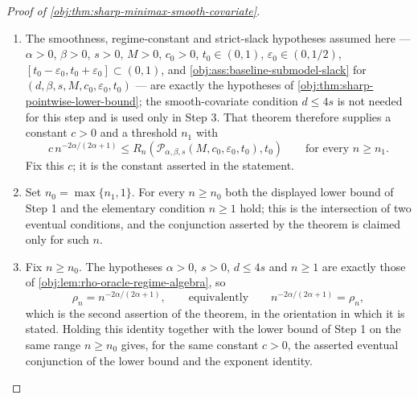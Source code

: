\documentclass[11pt]{article}
\begin{document}
\begin{proof}[Proof of \cref{obj:thm:sharp-minimax-smooth-covariate}]
\begin{enumerate}
\item The smoothness, regime-constant and strict-slack hypotheses assumed here — \(\alpha>0\),
\(\beta>0\), \(s>0\), \(M>0\), \(c_0>0\), \(t_0\in(0,1)\), \(\varepsilon_0\in(0,1/2)\),
\([t_0-\varepsilon_0,t_0+\varepsilon_0]\subset(0,1)\), and \cref{obj:ass:baseline-submodel-slack}
for \((d,\beta,s,M,c_0,\varepsilon_0,t_0)\) — are exactly the hypotheses of
\cref{obj:thm:sharp-pointwise-lower-bound}; the smooth-covariate condition \(d\le 4s\) is not needed
for this step and is used only in Step 3. That theorem therefore supplies a constant \(c>0\) and a
threshold \(n_1\) with
\[
c\,n^{-2\alpha/(2\alpha+1)}
\le
R_n\!\left(
\mathcal P_{\alpha,\beta,s}(M,c_0,\varepsilon_0,t_0),t_0
\right)
\qquad\text{for every }n\ge n_1 .
\]
Fix this \(c\); it is the constant asserted in the statement. %

\item Set \(n_0=\max\{n_1,1\}\). For every \(n\ge n_0\) both the displayed lower bound of Step 1 and
the elementary condition \(n\ge1\) hold; this is the intersection of two eventual conditions, and
the conjunction asserted by the theorem is claimed only for such \(n\).

\item Fix \(n\ge n_0\). The hypotheses \(\alpha>0\), \(s>0\), \(d\le 4s\) and \(n\ge1\) are exactly
those of \cref{obj:lem:rho-oracle-regime-algebra}, so
\[
\rho_n
=
n^{-2\alpha/(2\alpha+1)},
\qquad\text{equivalently}\qquad
n^{-2\alpha/(2\alpha+1)}=\rho_n ,
\]
which is the second assertion of the theorem, in the orientation in which it is stated. Holding this
identity together with the lower bound of Step 1 on the same range \(n\ge n_0\) gives, for the same
constant \(c>0\), the asserted eventual conjunction of the lower bound and the exponent identity.
\end{enumerate}
\end{proof}
\end{document}
